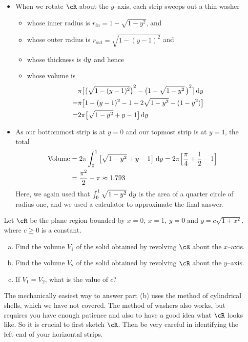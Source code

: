 \begin{solution}
\begin{itemize}
\item When we rotate $\cR$ about the $y$--axis,  each strip
sweeps out a thin washer
\begin{itemize}
\item
whose inner radius is $r_{in}=1-\sqrt{1-y^2}$, and
\item
whose outer radius is $r_{out}= \sqrt{1-(y-1)^2}$ and
\item
whose thickness is $\mathrm{d}y$ and hence
\item
whose volume is
\begin{align*}
&\pi\big[{\big(\sqrt{1-(y-1)^2}\big)}^2-{\big(1-\sqrt{1-y^2}\,\big)}^2\big]\,\mathrm{d}y\\
=&\pi \big[  1 - (y-1)^2       -1 + 2\sqrt{1-y^2} - (1-y^2)   \big]\\
=&2\pi\big[\sqrt{1-y^2}+y-1\big]\,\mathrm{d}y\end{align*}

\end{itemize}
\item As our bottommost strip is at $y=0$ and our topmost
strip is at $y=1$, the total
\begin{align*}
{\rm Volume} &= 2\pi\int_{0}^1\big[\sqrt{1-y^2}+y-1\big]\ \mathrm{d}y
= 2\pi\Big[\frac{\pi}{4}+\frac{1}{2}-1\Big]\\
&=\frac{\pi^2}{2}-\pi\approx 1.793
\end{align*}
Here, we again used that $\int_{0}^1 \sqrt{1-y^2}\ \mathrm{d}y$ is the area of a quarter
circle of radius one, and we used a calculator to approximate the final answer.
\end{itemize}

\end{solution}

\begin{Mquestion}[1997A]
Let $\cR$ be the plane region bounded by $x=0,\ x=1,\ y=0$
and $y=c\sqrt{1+x^2}$, where $c\ge 0$ is a constant.
\begin{enumerate}[(a)]
\item
Find the volume $V_1$ of the solid obtained by revolving
$\cR$ about the $x$--axis.
\item
Find the volume $V_2$ of the solid obtained by revolving
$\cR$ about the $y$--axis.
\item
 If $V_1=V_2$, what is the value of $c$?
\end{enumerate}
\end{Mquestion}

\begin{hint}
The mechanically easiest way to answer part (b) uses the method of cylindrical
shells, which we have not covered.  The method of washers also works, but requires  you have enough patience and also
to have a good idea what $\cR$ looks like. So it is crucial to first sketch $\cR$.
Then be very careful in identifying the left end of your horizontal strips.
\end{hint}

